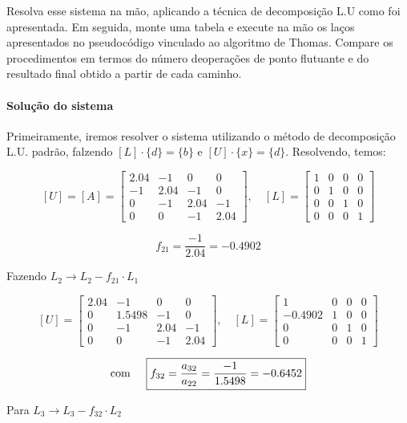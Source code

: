 \documentclass[12pt]{article}
\begin{document}
Resolva esse sistema na mão, aplicando a técnica de decomposição L.U como foi apresentada. Em seguida, monte uma tabela e execute na mão os laços apresentados no pseudocódigo vinculado ao algoritmo de Thomas. Compare os procedimentos em termos do número deoperações de ponto flutuante e do resultado final obtido a partir de cada caminho.

\paragraph{Solução do sistema} Primeiramente, iremos resolver o sistema utilizando o método de decomposição L.U. padrão, falzendo \([L]\cdot\{d\}=\{b\}\) e \([U]\cdot\{x\}=\{d\}\). Resolvendo, temos:

\[
  [U] = [A] = \begin{bmatrix}
    2.04 & -1 & 0 & 0 \\
    -1 & 2.04 & -1 & 0\\
    0 & -1 & 2.04 & -1 \\
    0 & 0 & -1 & 2.04
  \end{bmatrix}, \quad
  [L] = \begin{bmatrix}
    1 & 0 & 0 & 0 \\
    0 & 1 & 0 & 0 \\
    0 & 0 & 1 & 0 \\
    0 & 0 & 0 & 1
  \end{bmatrix}
\]

\[
\boxed{f_{21} = \frac{-1}{2.04} = -0.4902}
\]

Fazendo \(L_{2}\rightarrow L_{2} - f_{21} \cdot L_{1}\)


\[
  [U] = \begin{bmatrix}
    2.04 & -1 & 0 & 0 \\
    0 & 1.5498 & -1 & 0\\
    0 & -1 & 2.04 & -1 \\
    0 & 0 & -1 & 2.04
  \end{bmatrix}, \quad
  [L] = \begin{bmatrix}
    1 & 0 & 0 & 0 \\
    -0.4902 & 1 & 0 & 0 \\
    0 & 0 & 1 & 0 \\
    0 & 0 & 0 & 1
  \end{bmatrix}
\]

\[
\text{com} \hspace{0.5cm} \boxed{f_{32} = \frac{a_{32}}{a_{22}} = \frac{-1}{1.5498} = -0.6452}
\]

Para \(L_{3}\rightarrow L_{3} - f_{32} \cdot L_{2}\)
\end{document}
